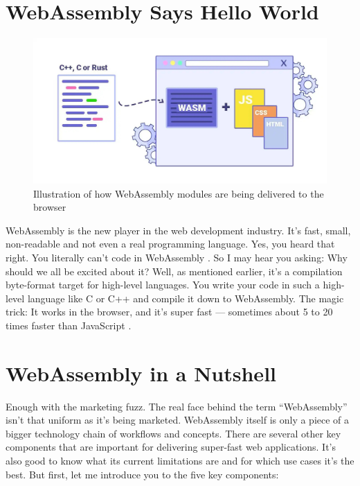 \documentclass[11pt]{article}
\begin{document}
\section{WebAssembly Says Hello World}
\label{sec:hello-world}

\begin{figure}[ht]
  \centering
  \includegraphics[width=\textwidth]{figures/004.jpg}
  \caption{Illustration of how WebAssembly modules are being delivered to the browser \citep{logrocket_logrocket_nodate}}
  \label{fig:wasm}
\end{figure}

WebAssembly is the new player in the web development industry. It’s fast, small, non-readable and not even a real programming language. Yes, you heard that right. You literally can’t code in WebAssembly \citep{rourke_learn_2018}. So I may hear you asking: Why should we all be excited about it? Well, as mentioned earlier, it’s a compilation byte-format target for high-level languages. You write your code in such a high-level language like C or C++ and compile it down to WebAssembly. The magic trick: It works in the browser, and it’s super fast — sometimes about 5 to 20 times faster than JavaScript \citep{aboukhalil_how_0200}.

\section{WebAssembly in a Nutshell}
\label{sec:in-a-nutshell}

Enough with the marketing fuzz. The real face behind the term “WebAssembly” isn’t that uniform as it’s being marketed. WebAssembly itself is only a piece of a bigger technology chain of workflows and concepts. There are several other key components that are important for delivering super-fast web applications. It’s also good to know what its current limitations are and for which use cases it’s the best. But first, let me introduce you to the five key components:
\end{document}
